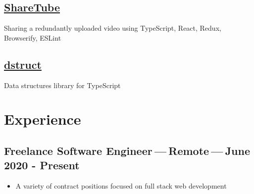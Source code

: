 \documentclass[11pt]{amsart}
\begin{document}
\hypertarget{x-\href{https://gitlab.com/emmajcline/sharetube}{sharetube}}{\subsection*{\href{https://gitlab.com/EmmaJCline/sharetube}{ShareTube}}}
Sharing a redundantly uploaded video using TypeScript, React, Redux, Browserify, ESLint


\hypertarget{x-\href{https://gitlab.com/emmajcline/dstruct}{dstruct}}{\subsection*{\href{https://gitlab.com/EmmaJCline/dstruct}{dstruct}}}
Data structures library for TypeScript


\hypertarget{x-experience}{\section*{Experience}}
\hypertarget{x-freelance-software-engineer — remote — june-2020---present}{\subsection*{Freelance Software Engineer — Remote — June 2020 - Present}}
\begin{itemize}

\item A variety of contract positions focused on full stack web development

\end{itemize}
\end{document}

